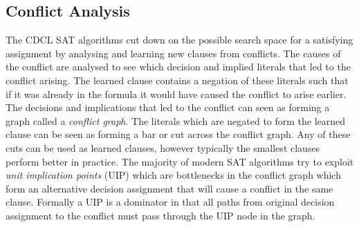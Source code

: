 \subsection*{Conflict Analysis}
The CDCL SAT algorithms cut down on the possible search space for a satisfying assignment by analysing and learning new clauses from conflicts. The causes of the conflict are analysed to see which decision and implied literals that led to the conflict arising. The learned clause contains a negation of these literals such that if it was already in the formula it would have caused the conflict to arise earlier. The decisions and implications that led to the conflict can seen as forming a graph called a \emph{conflict graph}. The literals which are negated to form the learned clause can be seen as forming a bar or cut across the conflict graph.
Any of these cuts can be used as learned clauses, however typically the smallest clauses perform better in practice. The majority of modern SAT algorithms try to exploit \emph{unit implication points} (UIP) which are bottlenecks in the conflict graph which form an alternative decision assignment that will cause a conflict in the same clause. Formally a UIP is a dominator in that all paths from original decision assignment to the conflict must pass through the UIP node in the graph. 
\medskip
